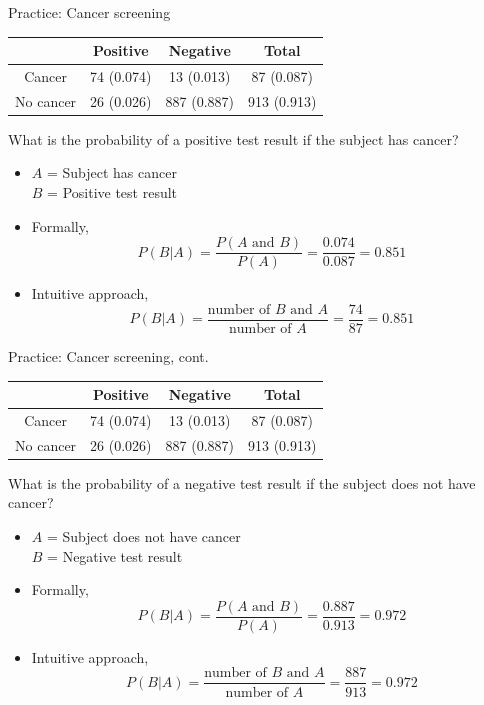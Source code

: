 \documentclass[xcolor=table, handout]{beamer}
\begin{document}
\begin{frame}{Practice: Cancer screening}
\begin{block}{}
{\centering \renewcommand{\arraystretch}{1}
\begin{tabular}{c | c  c | c}
 & Positive & Negative & Total \\
\hline
Cancer & 74 (0.074) & 13 (0.013) & 87 (0.087)\\
No cancer & 26 (0.026) & 887 (0.887) & 913 (0.913)\\
\end{tabular}\par
\renewcommand{\arraystretch}{1.5}
}
\end{block}

\begin{exampleblock}{}
What is the probability of a positive test result if the subject has cancer?
\begin{itemize}
\pause
\item $A$ = Subject has cancer\\
$B$ = Positive test result
\pause
\item Formally,
\[P(B|A) = \frac {P(A \text{ and } B)}{P(A)} = \frac {0.074}{0.087} = 0.851\]
\vspace*{-\baselineskip}\pause
\item Intuitive approach,
\[ P(B|A) = \frac{\text{number of $B$ and $A$}}{\text{number of $A$}} = \frac {74}{87} = 0.851\]
\end{itemize}
\end{exampleblock}
\end{frame}

\begin{frame}{Practice: Cancer screening, cont.}
\begin{block}{}
{\centering \renewcommand{\arraystretch}{1}
\begin{tabular}{c | c  c | c}
 & Positive & Negative & Total \\
\hline
Cancer & 74 (0.074) & 13 (0.013) & 87 (0.087)\\
No cancer & 26 (0.026) & 887 (0.887) & 913 (0.913)\\
\end{tabular}\par
\renewcommand{\arraystretch}{1.5}
}
\end{block}

\begin{exampleblock}{}
What is the probability of a negative test result if the subject does not have cancer?
\begin{itemize}
\pause
\item $A$ = Subject does not have cancer\\
$B$ = Negative test result
\pause
\item Formally,
\[P(B|A) = \frac {P(A \text{ and } B)}{P(A)} = \frac {0.887}{0.913} = 0.972\]
\vspace*{-\baselineskip}\pause
\item Intuitive approach,
\[ P(B|A) = \frac{\text{number of $B$ and $A$}}{\text{number of $A$}} = \frac {887}{913} = 0.972\]
\end{itemize}
\end{exampleblock}
\end{frame}
\end{document}
